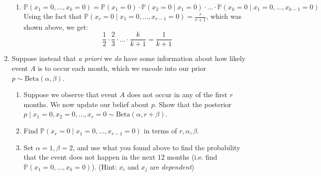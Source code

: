 \documentclass[11pt]{article}
\begin{document}
\begin{enumerate}
{\begin{enumerate}
        
        \item
        $$\mathbb{P}(x_1 = 0, ..., x_k = 0) = \mathbb{P}(x_1 = 0) \cdot \mathbb{P}(x_2 =0 \mid x_1=0) \cdot ... \cdot \mathbb{P}(x_k = 0 \mid x_1=0, ..., x_{k-1} = 0)$$
        Using the fact that $\mathbb{P}(x_r = 0 \mid x_1=0, ..., x_{r-1} = 0) = \frac{r}{r+1}$, which was shown above, we get:
        $$\frac{1}{2} \cdot \frac{2}{3} \cdot ... \cdot \frac{k}{k+1} = \boxed{\frac{1}{k+1}}$$
    \end{enumerate}
    }
    
    
    \item Suppose instead that \textit{a priori} we \textit{do} have some information about how likely event $A$ is to occur each month, which we encode into our prior $p \sim \text{Beta}(\alpha, \beta)$.

    \begin{enumerate}
    
    \item Suppose we observe that event $A$ does not occur in any of the first $r$ months. We now update our belief about $p$. Show that the posterior $p \mid x_1=0, x_2 = 0, ..., x_r = 0 \sim \text{Beta}(\alpha, r + \beta)$.
    
    \item Find $\mathbb{P}(x_r = 0 \mid x_1=0, ..., x_{r-1} = 0)$ in terms of $r, \alpha, \beta$.

    \item Set $\alpha = 1, \beta = 2$, and use what you found above to find the probability that the event does not happen in the next 12 months (i.e. find $\mathbb{P}(x_1 = 0, ..., x_k = 0)$).
    (Hint: $x_i$ and $x_j$ are \textit{dependent}) 
    \end{enumerate}


\end{enumerate}
\end{document}
